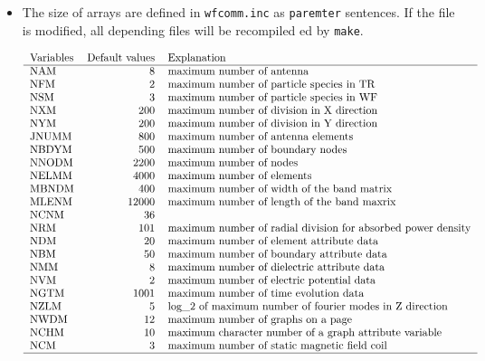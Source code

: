 \begin{itemize}
\item
The size of arrays are defined in \verb/wfcomm.inc/ as \verb/paremter/
sentences.  If the file is modified, all depending files will be
recompiled ed by \verb/make/.

\[
\begin{tabular}{lrl}
Variables & Default values & Explanation \\
\hline
NAM & 8 & maximum number of antenna \\
NFM & 2 & maximum number of particle species in TR \\
NSM & 3 & maximum number of particle species in WF \\
NXM & 200 & maximum number of division in X direction \\
NYM & 200 & maximum number of division in Y direction \\
JNUMM & 800 & maximum number of antenna elements \\
NBDYM & 500 & maximum number of boundary nodes \\
NNODM & 2200 & maximum number of nodes \\
NELMM & 4000 & maximum number of elements \\
MBNDM & 400 & maximum number of width of the band matrix \\
MLENM & 12000 & maximum number of length of the band maxrix \\
NCNM & 36 & \\
NRM & 101 & maximum number of radial division for absorbed power density \\
NDM & 20 & maximum number of element attribute data \\
NBM & 50 & maximum number of boundary attribute data \\
NMM & 8 & maximum number of dielectric attribute data \\
NVM & 2 & maximum number of electric potential data \\
NGTM & 1001 & maximum number of time evolution data \\
NZLM & 5 & log\_2 of maximum number of fourier modes in Z direction \\
NWDM & 12 & maximum number of graphs on a page \\
NCHM & 10 & maximum character number of a graph attribute variable \\
NCM & 3 & maximum number of static magnetic field coil \\
\hline
\end{tabular}
\]


\end{itemize}
